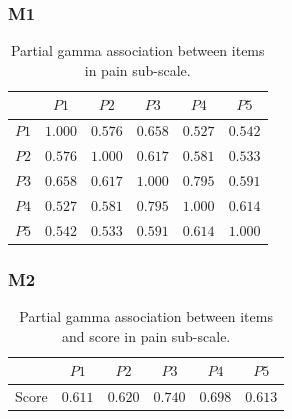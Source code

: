 \subsubsection{M1}
\begin{table}[H]
    \centering
    \begin{tabular}{c | c c c c c}
            & $P1$ & $P2$ & $P3$ & $P4$ & $P5$\\
            \hline 
        $P1$ & $1.000$ & $0.576$ & $0.658$ & $0.527$ & $0.542$ \\
        $P2$ & $0.576$ & $1.000$ & $0.617$ & $0.581$ & $0.533$ \\
        $P3$ & $0.658$ & $0.617$ & $1.000$ & $0.795$ & $0.591$ \\
        $P4$ & $0.527$ & $0.581$ & $0.795$ & $1.000$ & $0.614$ \\
        $P5$ & $0.542$ & $0.533$ & $0.591$ & $0.614$ & $1.000$ \\
         \hline    
    \end{tabular}
    \caption{Partial gamma association between items in pain sub-scale.}
    \label{tab:M1_pain}
\end{table}

\subsubsection{M2}
\begin{table}[H]
    \centering
    \begin{tabular}{c|c c c c c }
    & $P1$ & $P2$ & $P3$ & $P4$ & $P5$\\
            \hline 
    Score & $0.611$ & $0.620$ & $0.740$ & $0.698$ &  $0.613$ \\
    \hline 
    \end{tabular}
    \caption{Partial gamma association between items and score in pain sub-scale.}
    \label{tab:M2_dis}
\end{table}

